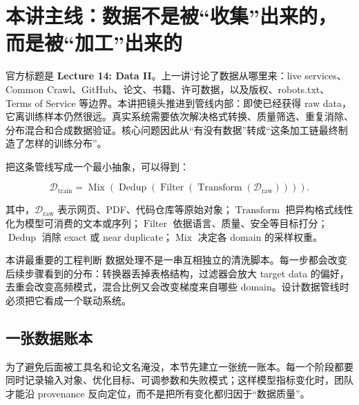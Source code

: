 \documentclass[a4paper]{article}
\begin{document}
\makecscover

\section{本讲主线：数据不是被“收集”出来的，而是被“加工”出来的}

官方标题是 \textbf{Lecture 14: Data II}。上一讲讨论了数据从哪里来：live services、Common Crawl、GitHub、论文、书籍、许可数据，以及版权、robots.txt、Terms of Service 等边界。本讲把镜头推进到管线内部：即使已经获得 raw data，它离训练样本仍然很远。真实系统需要依次解决格式转换、质量筛选、重复消除、分布混合和合成数据验证。核心问题因此从“有没有数据”转成“这条加工链最终制造了怎样的训练分布”。

把这条管线写成一个最小抽象，可以得到：

$$
\mathcal{D}_{\mathrm{train}}
=\operatorname{Mix}\!\left(
\operatorname{Dedup}\!\left(
\operatorname{Filter}\!\left(
\operatorname{Transform}(\mathcal{D}_{\mathrm{raw}})
\right)\right)\right).
$$

其中，$\mathcal{D}_{\mathrm{raw}}$ 表示网页、PDF、代码仓库等原始对象；$\operatorname{Transform}$ 把异构格式线性化为模型可消费的文本或序列；$\operatorname{Filter}$ 依据语言、质量、安全等目标打分；$\operatorname{Dedup}$ 消除 exact 或 near duplicate；$\operatorname{Mix}$ 决定各 domain 的采样权重。

\begin{importantbox}{本讲最重要的工程判断}
数据处理不是一串互相独立的清洗脚本。每一步都会改变后续步骤看到的分布：转换器丢掉表格结构，过滤器会放大 target data 的偏好，去重会改变高频模式，混合比例又会改变梯度来自哪些 domain。设计数据管线时必须把它看成一个联动系统。
\end{importantbox}


\subsection{一张数据账本}

为了避免后面被工具名和论文名淹没，本节先建立一张统一账本。每一个阶段都要同时记录输入对象、优化目标、可调参数和失败模式；这样模型指标变化时，团队才能沿 provenance 反向定位，而不是把所有变化都归因于“数据质量”。
\end{document}
